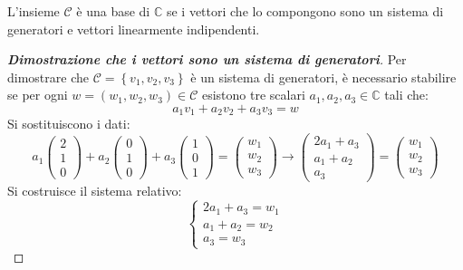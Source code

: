 \documentclass[a4paper]{article}
\begin{document}
	\noindent
	L'insieme $\mathscr{C}$ è una base di $\mathbb{C}$ se i vettori che lo compongono sono un sistema di generatori e vettori linearmente indipendenti.
	
	\begin{proof}[\textbf{Dimostrazione che i vettori sono un sistema di generatori}]
		Per dimostrare che $\mathscr{C} = \left\{v_{1}, v_{2}, v_{3}\right\}$ è un sistema di generatori, è necessario stabilire se per ogni $w = \left(w_{1}, w_{2}, w_{3}\right) \in \mathscr{C}$ esistono tre scalari $a_{1}, a_{2}, a_{3} \in \mathbb{C}$ tali che:
		\begin{equation*}
			a_{1}v_{1} + a_{2}v_{2} + a_{3}v_{3} = w
		\end{equation*}
		Si sostituiscono i dati:
		\begin{equation*}
			a_{1} \begin{pmatrix}
				2 \\ 1 \\ 0
			\end{pmatrix} + a_{2} \begin{pmatrix}
				0 \\ 1 \\ 0
			\end{pmatrix} + a_{3} \begin{pmatrix}
				1 \\ 0 \\ 1
			\end{pmatrix} = \begin{pmatrix}
				w_{1} \\ w_{2} \\ w_{3}
			\end{pmatrix} \longrightarrow
			\begin{pmatrix}
				2a_{1} + a_{3} \\
				a_{1}  + a_{2} \\
				a_{3}
			\end{pmatrix} = \begin{pmatrix}
				w_{1} \\ w_{2} \\ w_{3}
			\end{pmatrix}
		\end{equation*}
		Si costruisce il sistema relativo:
		\begin{equation*}
			\begin{cases}
				2a_{1} + a_{3} = w_{1} \\
				a_{1}  + a_{2} = w_{2}\\
				a_{3} = w_{3}
			\end{cases}

\end{equation*}
\end{proof}
\end{document}
